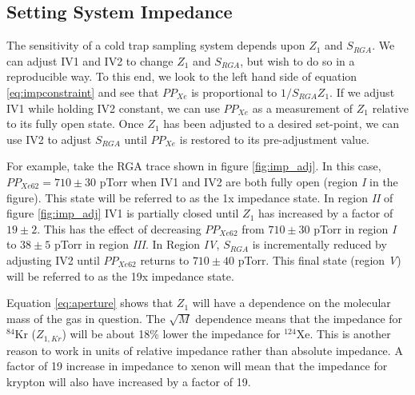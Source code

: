 \documentclass[12pt]{article}
\begin{document}
\subsection{Setting System Impedance}
\label{sec:imp_set}
The sensitivity of a cold trap sampling system depends upon $Z_1$ and $S_{RGA}$. We can adjust IV1 and IV2 to change $Z_1$ and $S_{RGA}$, but wish to do so in a reproducible way. To this end, we look to the left hand side of equation \ref{eq:impconstraint} and see that $PP_{Xe}$ is proportional to $1/S_{RGA}Z_1$. If we adjust IV1 while holding IV2 constant, we can use $PP_{Xe}$ as a measurement of $Z_1$ relative to its fully open state. Once $Z_1$ has been adjusted to a desired set-point, we can use IV2 to adjust $S_{RGA}$ until $PP_{Xe}$ is restored to its pre-adjustment value.

For example, take the RGA trace shown in figure \ref{fig:imp_adj}. In this case, $PP_{Xe62}= 710 \pm30$ pTorr when IV1 and IV2 are both fully open (region \emph{I} in the figure). This state will be referred to as the 1x impedance state. In region \emph{II} of figure \ref{fig:imp_adj} IV1 is partially closed until $Z_1$ has increased by a factor of $19\pm2$. This has the effect of decreasing $PP_{Xe62}$ from $710\pm30$ pTorr in region \emph{I} to $38\pm5$ pTorr in region \emph{III}. In Region \emph{IV}, $S_{RGA}$ is incrementally reduced by adjusting IV2 until $PP_{Xe62}$ returns to $710\pm40$ pTorr. This final state (region \emph{V}) will be referred to as the 19x impedance state. 

Equation \ref{eq:aperture} shows that $Z_1$ will have a dependence on the molecular mass of the gas in question. The $\sqrt{M}$ dependence means that the impedance for $^{84}$Kr ($Z_{1,Kr}$) will be about 18\% lower the impedance for $^124$Xe. This is another reason to work in units of relative impedance rather than absolute impedance. A factor of 19 increase in impedance to xenon will mean that the impedance for krypton will also have increased by a factor of 19.
\end{document}
